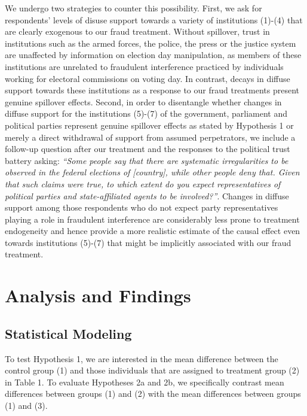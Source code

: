 \documentclass[11pt, ngerman,english,a4]{article}
\begin{document}
We undergo two strategies to counter this possibility. First, we ask for respondents’ levels of disuse support towards a variety of institutions (1)-(4) that are clearly exogenous to our fraud treatment. Without spillover, trust in institutions such as the armed forces, the police, the press or the justice system are unaffected by information on election day manipulation, as members of these institutions are unrelated to fraudulent interference practiced by individuals working for electoral commissions on voting day. In contrast, decays in diffuse support towards these institutions as a response to our fraud treatments present genuine spillover effects. Second, in order to disentangle whether changes in diffuse support for the institutions (5)-(7) of the government, parliament and political parties represent genuine spillover effects as stated by Hypothesis 1 or merely a direct withdrawal of support from assumed perpetrators, we include a follow-up question after our treatment and the responses to the political trust battery asking: \textit{“Some people say that there are systematic irregularities to be observed in the federal elections of [country], while other people deny that. Given that such claims were true, to which extent do you expect representatives of political parties and state-affiliated agents to be involved?”}. Changes in diffuse support among those respondents who do not expect party representatives playing a role in fraudulent interference are considerably less prone to treatment endogeneity and hence provide a more realistic estimate of the causal effect even towards institutions (5)-(7) that might be implicitly associated with our fraud treatment. 

\section*{Analysis and Findings}

\subsection*{Statistical Modeling}

To test Hypothesis 1, we are interested in the mean difference between the control group (1) and those individuals that are assigned to treatment group (2) in Table 1. To evaluate Hypotheses 2a and 2b, we specifically contrast mean differences between groups (1) and (2) with the mean differences between groups (1) and (3). 
\end{document}
